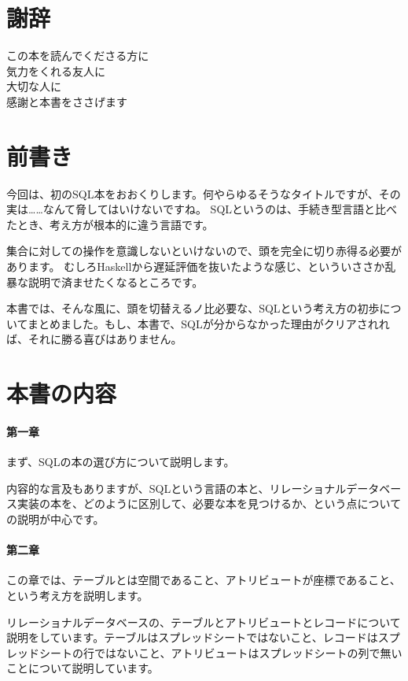 \section*{謝辞}
\begin{center}
この本を読んでくださる方に \\
気力をくれる友人に \\
大切な人に \\
感謝と本書をささげます
\end{center}

\section*{前書き}

今回は、初のSQL本をおおくりします。何やらゆるそうなタイトルですが、その実は……なんて脅してはいけないですね。
SQLというのは、手続き型言語と比べたとき、考え方が根本的に違う言語です。

集合に対しての操作を意識しないといけないので、頭を完全に切り赤得る必要があります。
むしろHaskellから遅延評価を抜いたような感じ、といういささか乱暴な説明で済ませたくなるところです。

本書では、そんな風に、頭を切替えるノ比必要な、SQLという考え方の初歩についてまとめました。もし、本書で、SQLが分からなかった理由がクリアされれば、それに勝る喜びはありません。

\section*{本書の内容}

\paragraph{第一章}

まず、SQLの本の選び方について説明します。

内容的な言及もありますが、SQLという言語の本と、リレーショナルデータベース実装の本を、どのように区別して、必要な本を見つけるか、という点についての説明が中心です。

\paragraph{第二章}

この章では、テーブルとは空間であること、アトリビュートが座標であること、という考え方を説明します。

リレーショナルデータベースの、テーブルとアトリビュートとレコードについて説明をしています。テーブルはスプレッドシートではないこと、レコードはスプレッドシートの行ではないこと、アトリビュートはスプレッドシートの列で無いことについて説明しています。

